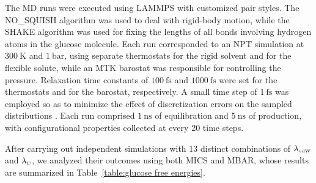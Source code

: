 \documentclass[journal=jctcce,manuscript=article]{achemso}
\begin{document}
The MD runs were executed using LAMMPS \cite{Plimpton_1995} with customized pair styles. The NO\_SQUISH algorithm \cite{Dullweber_1997, Miller_2002, Silveira_2017} was used to deal with rigid-body motion, while the SHAKE algorithm \cite{Ryckaert_1977} was used for fixing the lengths of all bonds involving hydrogen atoms in the glucose molecule. Each run corresponded to an NPT simulation at $300~\text{K}$ and $1~\text{bar}$, using separate thermostats for the rigid solvent\cite{Kamberaj_2005} and for the flexible solute\cite{Martyna_1994}, while an MTK barostat\cite{Martyna_1994} was responsible for controlling the pressure. Relaxation time constants of $100~\text{fs}$ and $1000~\text{fs}$ were set for the thermostats and for the barostat, respectively. A small time step of $1~\text{fs}$ was employed so as to minimize the effect of discretization errors on the sampled distributions \cite{Davidchack_2012, Silveira_2017}. Each run comprised $1~\text{ns}$ of equilibration and $5~\text{ns}$ of production, with configurational properties collected at every 20 time steps.

After carrying out independent simulations with 13 distinct combinations of $\lambda_\text{\tiny vdW}$ and $\lambda_\text{\tiny C}$, we analyzed their outcomes using both MICS and MBAR, whose results are summarized in Table~\ref{table:glucose free energies}. %


\end{document}

